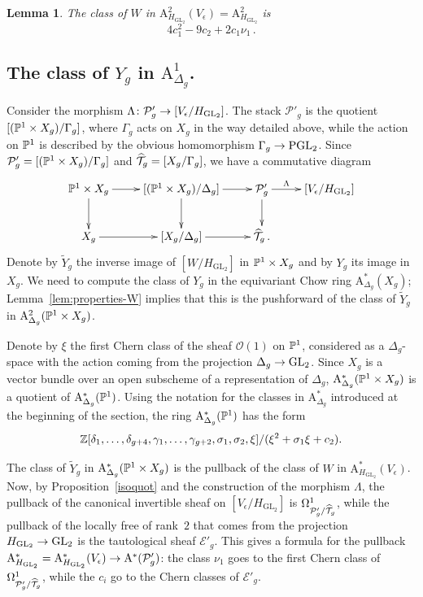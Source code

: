 \documentclass{amsart}
\numberwithin{equation}{section}
\numberwithin{subsection}{section}
\newtheorem{lemma}[theorem]{Lemma}
\theoremstyle{definition}
\theoremstyle{remark}
\newcommand\cE{\mathcal{E}} \newcommand\cF{\mathcal{F}}
\newcommand\cO{\mathcal{O}} \newcommand\cP{\mathcal{P}}
\newcommand\rA{\mathrm{A}} \newcommand\rB{\mathrm{B}}
\newcommand\arr{\ifinner\to\else\longrightarrow\fi}
\newcommand{\OT}[1][g]{\widehat{\cT}_{#1}}
\newcommand{\GL}{\mathrm{GL}}
\newcommand{\PGL}{\mathrm{PGL}}
\newcommand\Hg{H_{\GL_2}}
\newcommand\Ve{V_{\epsilon}}
\begin{document}
\begin{lemma}\label{lem:class-W}
The class of $W$ in $\rA^{2}_{\Hg}(\Ve) = \rA^{2}_{\Hg}$ is
   \[
   4c_1^2 - 9c_2 + 2c_{1}\nu_1\,.
   \]
\end{lemma}



\subsection*{The class of $Y_{g}$ in $\rA^{1}_{\Delta_{g}}$.}


Consider the morphism $\Lambda\colon \cP'_{g} \arr [\Ve/\Hg]$. The stack $\cP'_{g}$ is the quotient $[(\mathbb{P}^{1}\times X_{g})/\Gamma_{g}]$, where $\Gamma_{g}$ acts on $X_{g}$ in the way detailed above, while the action on $\mathbb{P}^{1}$ is described by the obvious homomorphism $\Gamma_{g} \arr \PGL_{2}$. Since $\cP'_{g} = [(\PP^{1}\times X_{g})/\Gamma_{g}]$ and $\OT = [X_{g}/\Gamma_{g}]$, we have a commutative diagram
   \[
   \xymatrix{
   \PP^{1}\times X_{g} \ar[r]\ar[d]&
   [(\PP^{1}\times X_{g})/\Delta_{g}] \ar[r]\ar[d]&
   \cP'_{g}\ar[r]^-{\Lambda}\ar[d]&
   [\Ve/\Hg]\\
   X_{g} \ar[r]&
   [X_{g}/\Delta_{g}] \ar[r]&
   \OT\,.
   }
   \]
Denote by $\widetilde{Y}_{g}$ the inverse image of $[W/\Hg]$ in $\mathbb{P}^{1}\times X_{g}$ and by $Y_{g}$ its image in $X_{g}$. We need to compute the class of $Y_{g}$ in the equivariant Chow ring $\rA^{*}_{\Delta_{g}}(X_{g})$; Lemma~\ref{lem:properties-W} implies that this is the pushforward of the class of $\widetilde{Y}_{g}$ in $\rA^{2}_{\Delta_{g}}(\PP^{1}\times X_{g})$. 

Denote by $\xi$ the first Chern class of the sheaf $\cO(1)$ on $\mathbb{P}^{1}$, considered as a $\Delta_{g}$-space with the action coming from the projection $\Delta_{g} \arr \GL_{2}$. Since $X_{g}$ is a vector bundle over an open subscheme of a representation of $\Delta_{g}$, $\rA^{*}_{\Delta_{g}}(\PP^{1}\times X_{g})$ is a quotient of $\rA^*_{\Delta_{g}}(\PP^{1})$. Using the notation for the classes in $\rA^*_{\Delta_{g}}$ introduced at the beginning of the section, the ring $\rA^*_{\Delta_{g}}(\PP^{1})$ has the form
   \[
   \mathbb{Z}[\delta_{1}, \dots, \delta_{g+4}, \gamma_{1}, \dots, \gamma_{g+2},
   \sigma_{1}, \sigma_{2}, \xi]/(\xi^{2} + \sigma_{1}\xi + c_{2}).
   \]

The class of $\widetilde{Y}_{g}$ in $\rA^{*}_{\Delta_{g}}(\PP^{1}\times X_{g})$ is the pullback of the class of $W$ in $\rA^{*}_{\Hg}(\Ve)$. Now, by Proposition~\ref{isoquot} and the construction of the morphism $\Lambda$, the pullback of the canonical invertible sheaf on $[\Ve/\Hg]$ is $\Omega^{1}_{\cP'_{g}/\OT}$, while the pullback of the locally free of rank~$2$ that comes from the projection $\Hg \arr \GL_{2}$ is the tautological sheaf $\cE'_{g}$. This gives a formula for the pullback $\rA^{*}_{\Hg} = \rA^{*}_{\Hg}(\Ve) \arr \rA^{*}(\cP'_{g})$: the  class $\nu_{1}$ goes to the first Chern class of $\Omega^{1}_{\cP'_{g}/\OT}$, while the $c_{i}$ go to the Chern classes of $\cE'_{g}$.
\end{document}
